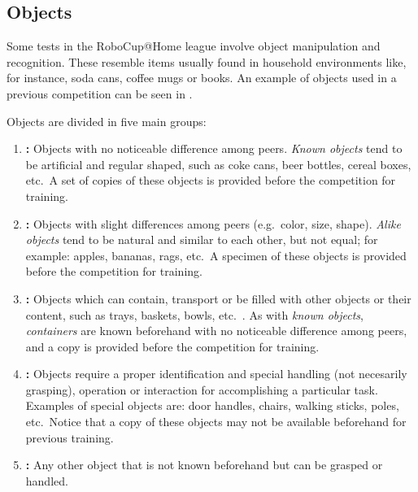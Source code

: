 %
%
%
\def\NumObjects{10\ }
\def\NumLocations{20\ }
\def\NumNames{20\ }

\subsection{Objects}
\label{rule:scenario_objects}
Some tests in the RoboCup@Home league involve object manipulation and recognition. These  resemble items usually found in household environments like, for instance, soda cans, coffee mugs or books. An example of objects used in a previous competition can be seen in .

Objects are divided in five main groups:

\begin{enumerate}
	\item \textbf{:} Objects with no noticeable difference among peers. \textit{Known objects} tend to be artificial and regular shaped, such as coke cans, beer bottles, cereal boxes, etc.~A set of copies of these objects is provided before the competition for training.

	\item \textbf{:} Objects with slight differences among peers (e.g.~color, size, shape). \textit{Alike objects} tend to be natural and similar to each other, but not equal; for example: apples, bananas, rags, etc.~A specimen of these objects is provided before the competition for training.

	\item \textbf{:} Objects which can contain, transport or be filled with other objects or their content, such as trays, baskets, bowls, etc.~. As with \textit{known objects}, \textit{containers} are known beforehand with no noticeable difference among peers, and a copy is provided before the competition for training.

	\item \textbf{:} Objects require a proper identification and special handling (not necesarily grasping), operation or interaction for accomplishing a particular task. Examples of special objects are: door handles, chairs, walking sticks, poles, etc.~Notice that a copy of these objects may not be available beforehand for previous training.

	\item \textbf{:} Any other object that is not known beforehand but can be grasped or handled.
\end{enumerate}

